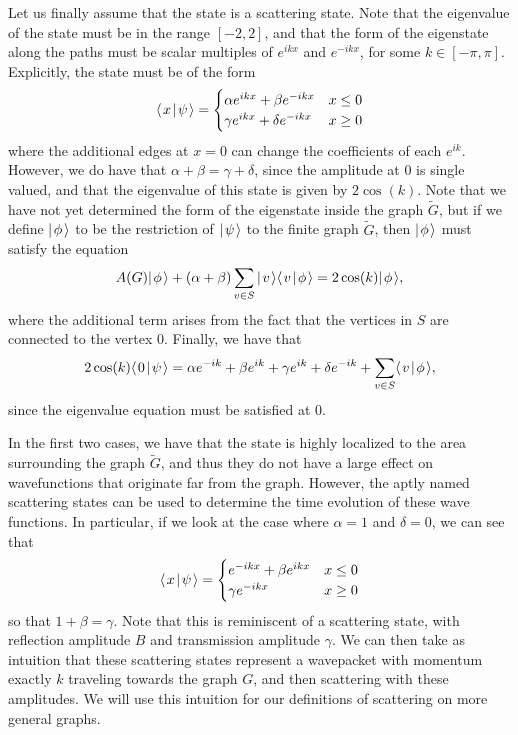 \documentclass[../thesis-main/thesis-main]{subfiles}
\begin{document}
Let us finally assume that the state is a scattering state.  Note that the eigenvalue of the state must be in the range $[-2,2]$, and that the form of the eigenstate along the paths must be scalar multiples of $e^{ikx}$ and $e^{-ikx}$, for some $k\in [-\pi, \pi]$.  Explicitly, the state must be of the form
\begin{align}
  \langle\mspace{2mu} x \mspace{2mu} | \mspace{2mu} \psi\mspace{2mu} \rangle = \begin{cases} \alpha e^{i k x} + \beta e^{-i k x} & x \leq 0\\
   \gamma  e^{i k x} + \delta e^{-i k x} & x\geq 0\end{cases}
\end{align}
where the additional edges at $x=0$ can change the coefficients of each $e^{ik}$.  However, we do have that $\alpha + \beta = \gamma +\delta$, since the amplitude at $0$ is single valued, and that the eigenvalue of this state is given by $2\cos(k)$.  Note that we have not yet determined the form of the eigenstate inside the graph $\widetilde{G}$, but if we define $|\mspace{2mu} \phi \mspace{2mu} \rangle$ to be the restriction of $|\mspace{2mu} \psi \mspace{2mu} \rangle$ to the finite graph $\widetilde{G}$, then $|\mspace{2mu} \phi \mspace{2mu} \rangle$ must satisfy the equation
\begin{equation}
  A(G) |\mspace{2mu} \phi \mspace{2mu} \rangle + (\alpha + \beta)\sum_{v\in S} |\mspace{2mu} v \mspace{2mu} \rangle\langle\mspace{2mu} v \mspace{2mu} | \mspace{2mu} \phi\mspace{2mu} \rangle = 2\cos(k) |\mspace{2mu} \phi \mspace{2mu} \rangle,
\end{equation}
where the additional term arises from the fact that the vertices in $S$ are connected to the vertex $0$.  Finally, we have that
\begin{equation}
  2 \cos(k)\langle\mspace{2mu} 0 \mspace{2mu} | \mspace{2mu} \psi\mspace{2mu} \rangle = \alpha e^{-ik} + \beta e^{ik} + \gamma e^{i k} + \delta e^{-ik} + \sum_{v\in S} \langle\mspace{2mu} v \mspace{2mu} | \mspace{2mu} \phi\mspace{2mu} \rangle,
\end{equation}
since the eigenvalue equation must be satisfied at $0$.

In the first two cases, we have that the state is highly localized to the area surrounding the graph $\widetilde{G}$, and thus they do not have a large effect on wavefunctions that originate far from the graph.  However, the aptly named scattering states can be used to determine the time evolution of these wave functions.  In particular, if we look at the case where $\alpha = 1$ and $\delta = 0$,  we can see that
\begin{align}
  \langle\mspace{2mu} x \mspace{2mu} | \mspace{2mu} \psi\mspace{2mu} \rangle = \begin{cases} e^{-ikx} + \beta e^{i kx} & x\leq 0\\
  \gamma e^{-ikx} & x \geq 0\end{cases}
\end{align}
so that $1+ \beta  =\gamma$.  Note that this is reminiscent of a scattering state, with reflection amplitude $B$ and transmission amplitude $\gamma$.  We can then take as intuition that these scattering states represent a wavepacket with momentum exactly $k$ traveling towards the graph $G$, and then scattering with these amplitudes.  We will use this intuition for our definitions of scattering on more general graphs. 
 
\end{document}
